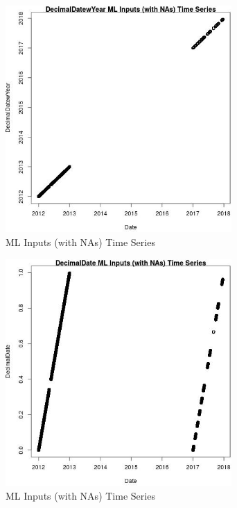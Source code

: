 \begin{figure} 
\centering  
\includegraphics[width=0.77\textwidth]{Code_Outputs/Report_ML_input_PM25_Step4_part_e_de_duplicated_aves_compiled_2019-05-14wNAs_DecimalDatewYearvDate.jpg} 
\caption{\label{fig:Report_ML_input_PM25_Step4_part_e_de_duplicated_aves_compiled_2019-05-14wNAsDecimalDatewYearvDate}ML Inputs (with NAs) Time Series} 
\end{figure} 
 

\begin{figure} 
\centering  
\includegraphics[width=0.77\textwidth]{Code_Outputs/Report_ML_input_PM25_Step4_part_e_de_duplicated_aves_compiled_2019-05-14wNAs_DecimalDatevDate.jpg} 
\caption{\label{fig:Report_ML_input_PM25_Step4_part_e_de_duplicated_aves_compiled_2019-05-14wNAsDecimalDatevDate}ML Inputs (with NAs) Time Series} 
\end{figure} 
 
